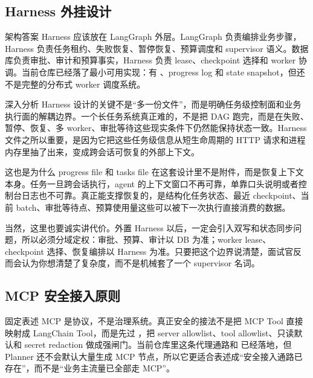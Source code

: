 \documentclass[12pt]{article}
\begin{document}
\subsection{Harness 外挂设计}
\begin{center}

\end{center}

\begin{qaBox}{架构答案}
Harness 应该放在 LangGraph 外层。LangGraph 负责编排业务步骤，Harness 负责任务租约、失败恢复、暂停恢复、预算调度和 supervisor 语义。数据库负责审批、审计和预算事实，Harness 负责 lease、checkpoint 选择和 worker 协调。当前仓库已经落了最小可用实现：有 、progress log 和 state snapshot，但还不是完整的分布式 worker 调度系统。
\end{qaBox}

\begin{analysisBox}{深入分析}
Harness 设计的关键不是“多一份文件”，而是明确任务级控制面和业务执行面的解耦边界。一个长任务系统真正难的，不是把 DAG 跑完，而是在失败、暂停、恢复、多 worker、审批等待这些现实条件下仍然能保持状态一致。Harness 文件之所以重要，是因为它把这些任务级信息从短生命周期的 HTTP 请求和进程内存里抽了出来，变成跨会话可恢复的外部上下文。

这也是为什么 progress file 和 tasks file 在这套设计里不是附件，而是恢复上下文本身。任务一旦跨会话执行，agent 的上下文窗口不再可靠，单靠口头说明或者控制台日志也不可靠。真正能支撑恢复的，是结构化任务状态、最近 checkpoint、当前 batch、审批等待点、预算使用量这些可以被下一次执行直接消费的数据。

当然，这里也要诚实讲代价。外置 Harness 以后，一定会引入双写和状态同步问题，所以必须分域定权：审批、预算、审计以 DB 为准；worker lease、checkpoint 选择、恢复编排以 Harness 为准。只要把这个边界说清楚，面试官反而会认为你想清楚了复杂度，而不是机械套了一个 supervisor 名词。
\end{analysisBox}

\subsection{MCP 安全接入原则}
\begin{center}

\end{center}

\begin{qaBox}{固定表述}
MCP 是协议，不是治理系统。真正安全的接法不是把 MCP Tool 直接映射成 LangChain Tool，而是先过 ，把 server allowlist、tool allowlist、只读默认和 secret redaction 做成强闸门。当前仓库里这条代理通路和  已经落地，但 Planner 还不会默认大量生成 MCP 节点，所以它更适合表述成“安全接入通路已存在”，而不是“业务主流量已全部走 MCP”。
\end{qaBox}
\end{document}
